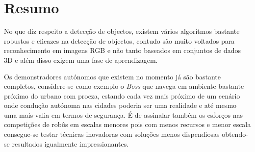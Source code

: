 \section{Resumo}

No que diz respeito a detecção de objectos, existem vários algoritmos bastante robustos e
eficazes na detecção de objectos, contudo são muito voltados para reconhecimento em imagens RGB
e não tanto baseados em conjuntos de dados 3D e além disso exigem uma fase de aprendizagem.

Os demonstradores autónomos que existem no momento já são bastante completos, considere-se
como exemplo o \emph{Boss} que navega em ambiente bastante próximo do urbano com proeza,
estando cada vez mais próximo de um cenário onde condução autónoma nas cidades poderia ser
uma realidade e até mesmo uma mais-valia em termos de segurança. É de assinalar também os esforços
nas competições de robôs em escalas menores pois com menos recursos e menor escala consegue-se
testar técnicas inovadoras com soluções menos dispendiosas obtendo-se resultados igualmente
impressionantes.

